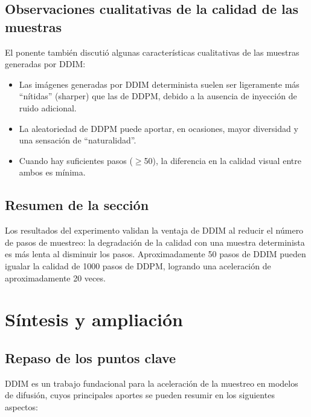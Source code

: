 \documentclass[a4paper]{article}
\begin{document}
\subsection{Observaciones cualitativas de la calidad de las muestras}

El ponente también discutió algunas características cualitativas de las muestras generadas por DDIM:

\begin{itemize}
    \item Las imágenes generadas por DDIM determinista suelen ser ligeramente más ``nítidas'' (sharper) que las de DDPM, debido a la ausencia de inyección de ruido adicional.
    \item La aleatoriedad de DDPM puede aportar, en ocasiones, mayor diversidad y una sensación de ``naturalidad''.
    \item Cuando hay suficientes pasos ($\geq$50), la diferencia en la calidad visual entre ambos es mínima.
\end{itemize}

\subsection{Resumen de la sección}

Los resultados del experimento validan la ventaja de DDIM al reducir el número de pasos de muestreo: la degradación de la calidad con una muestra determinista es más lenta al disminuir los pasos. Aproximadamente 50 pasos de DDIM pueden igualar la calidad de 1000 pasos de DDPM, logrando una aceleración de aproximadamente 20 veces.
\section{Síntesis y ampliación}

\subsection{Repaso de los puntos clave}

DDIM es un trabajo fundacional para la aceleración de la muestreo en modelos de difusión, cuyos principales aportes se pueden resumir en los siguientes aspectos:
\end{document}
